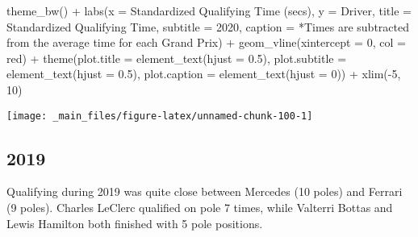 \documentclass[
]{book}
\newenvironment{Shaded}{\begin{snugshade}}{\end{snugshade}}
\newcommand{\AttributeTok}[1]{\textcolor[rgb]{0.77,0.63,0.00}{#1}}
\newcommand{\DecValTok}[1]{\textcolor[rgb]{0.00,0.00,0.81}{#1}}
\newcommand{\FloatTok}[1]{\textcolor[rgb]{0.00,0.00,0.81}{#1}}
\newcommand{\FunctionTok}[1]{\textcolor[rgb]{0.00,0.00,0.00}{#1}}
\newcommand{\NormalTok}[1]{#1}
\newcommand{\SpecialCharTok}[1]{\textcolor[rgb]{0.00,0.00,0.00}{#1}}
\newcommand{\StringTok}[1]{\textcolor[rgb]{0.31,0.60,0.02}{#1}}
\begin{document}
\begin{Shaded}
\begin{Highlighting}[]
  \FunctionTok{theme\_bw}\NormalTok{() }\SpecialCharTok{+}
  \FunctionTok{labs}\NormalTok{(}\AttributeTok{x =} \StringTok{\textquotesingle{}Standardized Qualifying Time (secs)\textquotesingle{}}\NormalTok{,}
       \AttributeTok{y =} \StringTok{\textquotesingle{}Driver\textquotesingle{}}\NormalTok{,}
       \AttributeTok{title =} \StringTok{\textquotesingle{}Standardized Qualifying Time\textquotesingle{}}\NormalTok{,}
       \AttributeTok{subtitle =} \StringTok{\textquotesingle{}2020\textquotesingle{}}\NormalTok{,}
       \AttributeTok{caption =} \StringTok{\textquotesingle{}*Times are subtracted from the average time for each Grand Prix\textquotesingle{}}\NormalTok{) }\SpecialCharTok{+}
  \FunctionTok{geom\_vline}\NormalTok{(}\AttributeTok{xintercept =} \DecValTok{0}\NormalTok{, }\AttributeTok{col =} \StringTok{\textquotesingle{}red\textquotesingle{}}\NormalTok{) }\SpecialCharTok{+}
  \FunctionTok{theme}\NormalTok{(}\AttributeTok{plot.title =} \FunctionTok{element\_text}\NormalTok{(}\AttributeTok{hjust =} \FloatTok{0.5}\NormalTok{),}
        \AttributeTok{plot.subtitle =} \FunctionTok{element\_text}\NormalTok{(}\AttributeTok{hjust =} \FloatTok{0.5}\NormalTok{),}
        \AttributeTok{plot.caption =} \FunctionTok{element\_text}\NormalTok{(}\AttributeTok{hjust =} \DecValTok{0}\NormalTok{)) }\SpecialCharTok{+}
  \FunctionTok{xlim}\NormalTok{(}\SpecialCharTok{{-}}\DecValTok{5}\NormalTok{, }\DecValTok{10}\NormalTok{)}
\end{Highlighting}
\end{Shaded}

\begin{center}\texttt{[image: \_main\_files/figure-latex/unnamed-chunk-100-1]} \end{center}

\hypertarget{section-4}{%
\subsection{2019}\label{section-4}}

Qualifying during 2019 was quite close between Mercedes (10 poles) and Ferrari (9 poles). Charles LeClerc qualified on pole 7 times, while Valterri Bottas and Lewis Hamilton both finished with 5 pole positions.
\end{document}
